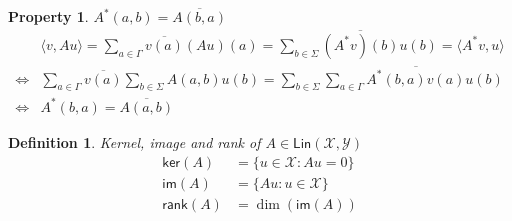 \documentclass[aps,pra,onecolumn,notitlepage,superscriptaddress]{revtex4-1}
\newcommand{\spc}[1]{\mathcal{#1}}
\newcommand{\Lin}{\mathsf{Lin}}
\newcommand{\rank}{\mathsf{rank}}
\newcommand{\im}{\mathsf{im}}
\newcommand{\myker}{\mathsf{ker}}
\def\>{\rangle}
\def\<{\langle}
\newtheorem{defi}{Definition}
\newtheorem{proper}{Property}
\begin{document}
    \begin{proper}
        $A^*(a,b) = \overline{A(b,a)}$
        \begin{align*}
            & \< v, Au \> = \sum_{a \in \Gamma} \overline{v(a)} (Au)(a) 
            = \sum_{b \in \Sigma} \overline{(A^*v)(b)} u(b) = \< A^*v, u \> \\
            \Longleftrightarrow & \sum_{a \in \Gamma} \overline{v(a)} \sum_{b \in \Sigma} A(a,b)u(b) = \sum_{b \in \Sigma} \sum_{a \in \Gamma}\overline{A^*(b,a)v(a)} u(b) \\
            \Longleftrightarrow & A^*(b,a) = \overline{A(a,b)}
        \end{align*}
    \end{proper}

    \begin{defi}
        Kernel, image and rank of $A \in \Lin(\spc X,\spc Y)$
        \begin{align}
            \myker(A) &= \{ u \in \spc X : Au = 0 \} \\
            \im(A) &= \{ Au : u \in \spc X \} \\
            \rank(A) &= \dim(\im(A))
        \end{align}
    \end{defi}
\end{document}
